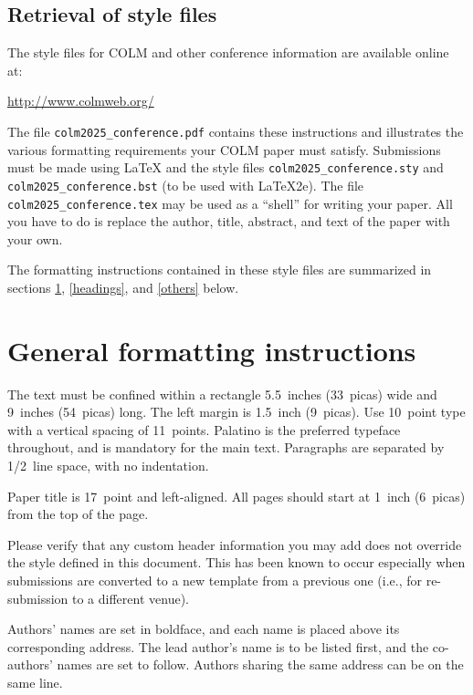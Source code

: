 \documentclass{article} %
\begin{document}
  

\subsection{Retrieval of style files}

The style files for COLM and other conference information are available online at:
\begin{center}
   \url{http://www.colmweb.org/}
\end{center}
The file \verb+colm2025_conference.pdf+ contains these
instructions and illustrates the
various formatting requirements your COLM paper must satisfy.
Submissions must be made using \LaTeX{} and the style files
\verb+colm2025_conference.sty+ and \verb+colm2025_conference.bst+ (to be used with \LaTeX{}2e). The file
\verb+colm2025_conference.tex+ may be used as a ``shell'' for writing your paper. All you
have to do is replace the author, title, abstract, and text of the paper with
your own.

The formatting instructions contained in these style files are summarized in
sections \ref{gen_inst}, \ref{headings}, and \ref{others} below.

\section{General formatting instructions}
\label{gen_inst}

The text must be confined within a rectangle 5.5~inches (33~picas) wide and
9~inches (54~picas) long. The left margin is 1.5~inch (9~picas).
Use 10~point type with a vertical spacing of 11~points. Palatino is the
preferred typeface throughout, and is mandatory for the main text. Paragraphs are separated by 1/2~line space, with no indentation. 

Paper title is 17~point and left-aligned.
All pages should start at 1~inch (6~picas) from the top of the page.

Please verify that any custom header information you may add does not override the style defined in this document. This has been known to occur especially when submissions are converted to a new template from a previous one (i.e., for re-submission to a different venue). 

Authors' names are
set in boldface, and each name is placed above its corresponding
address. The lead author's name is to be listed first, and
the co-authors' names are set to follow. Authors sharing the
same address can be on the same line.
\end{document}
